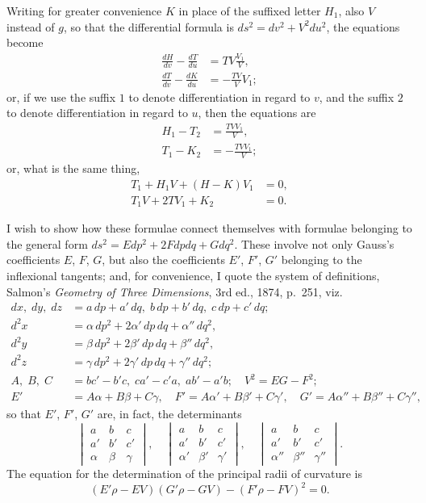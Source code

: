 \documentclass[11pt,a4paper]{article}
\theoremstyle{definition}
\begin{document}
Writing for greater convenience $K$ in place of the suffixed letter $H_1$, also $V$ instead of $g$, so that the differential formula is $ds^2 = dv^2 + V^2 du^2$, the equations become
\[
\begin{aligned}
\frac{dH}{dv} - \frac{dT}{du} &= TV \frac{V_1}{V},\\
\frac{dT}{dv} - \frac{dK}{du} &= -\frac{TV}{V} V_1;
\end{aligned}
\]
or, if we use the suffix $1$ to denote differentiation in regard to $v$, and the suffix $2$ to denote differentiation in regard to $u$, then the equations are
\[
\begin{aligned}
H_1 - T_2 &= \frac{TV V_1}{V},\\
T_1 - K_2 &= -\frac{TV V_1}{V};
\end{aligned}
\]
or, what is the same thing,
\[
\begin{aligned}
T_1 + H_1 V + (H - K)V_1 &= 0,\\
T_1 V + 2TV_1 + K_2 &= 0.
\end{aligned}
\]

I wish to show how these formulae connect themselves with formulae belonging to the general form $ds^2 = Edp^2 + 2Fdpdq + Gdq^2$. These involve not only Gauss's coefficients $E$, $F$, $G$, but also the coefficients $E'$, $F'$, $G'$ belonging to the inflexional tangents; and, for convenience, I quote the system of definitions, Salmon's \textit{Geometry of Three Dimensions}, 3rd ed., 1874, p.~251, viz.
\[
\begin{aligned}
dx,\; dy,\; dz &= a\,dp + a'\,dq,\; b\,dp + b'\,dq,\; c\,dp + c'\,dq;\\
d^2x &= \alpha\,dp^2 + 2\alpha'\,dp\,dq + \alpha''\,dq^2,\\
d^2y &= \beta\,dp^2 + 2\beta'\,dp\,dq + \beta''\,dq^2,\\
d^2z &= \gamma\,dp^2 + 2\gamma'\,dp\,dq + \gamma''\,dq^2;\\
A,\; B,\; C &= bc' - b'c,\; ca' - c'a,\; ab' - a'b;\quad V^2 = EG - F^2;\\
E' &= A\alpha + B\beta + C\gamma,\quad F' = A\alpha' + B\beta' + C\gamma',\quad G' = A\alpha'' + B\beta'' + C\gamma'',
\end{aligned}
\]
so that $E'$, $F'$, $G'$ are, in fact, the determinants
\[
\begin{vmatrix}
a & b & c \\
a' & b' & c' \\
\alpha & \beta & \gamma
\end{vmatrix},\quad
\begin{vmatrix}
a & b & c \\
a' & b' & c' \\
\alpha' & \beta' & \gamma'
\end{vmatrix},\quad
\begin{vmatrix}
a & b & c \\
a' & b' & c' \\
\alpha'' & \beta'' & \gamma''
\end{vmatrix}.
\]
The equation for the determination of the principal radii of curvature is
\[
(E'\rho - EV)(G'\rho - GV) - (F'\rho - FV)^2 = 0.
\]
\end{document}

